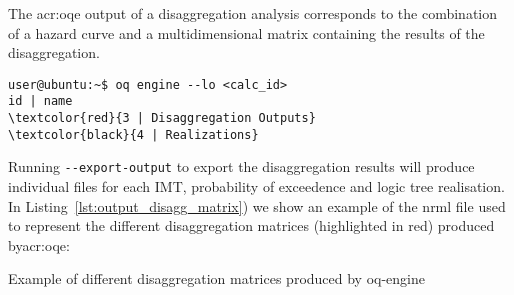 The \glsdesc{acr:oqe} output of a disaggregation analysis corresponds to the
combination of a hazard curve and a multidimensional matrix containing the
results of the disaggregation.

\begin{Verbatim}[frame=single, commandchars=\\\{\}, fontsize=\small]
user@ubuntu:~$ oq engine --lo <calc_id>
id | name
\textcolor{red}{3 | Disaggregation Outputs}
\textcolor{black}{4 | Realizations}
\end{Verbatim}
%

Running \texttt{-{}-export-output} to export the disaggregation results will
produce individual files for each IMT, probability of exceedence and logic tree
realisation. In Listing~\ref{lst:output_disagg_matrix}) we show an example of
the nrml file used to represent the different disaggregation matrices (highlighted
in red) produced by\gls{acr:oqe}:

\begin{listing}[htbp]
  
  \caption{Example of different disaggregation matrices produced by oq-engine}
  \label{lst:output_disagg_matrix}
\end{listing}


